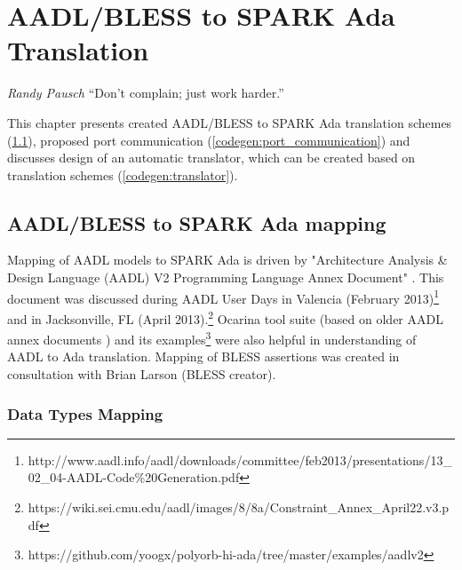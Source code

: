 
\cleardoublepage


\chapter{AADL/BLESS to SPARK Ada Translation}
\label{codegen}

\begin{chapquote}{\textit{Randy Pausch}}
``Don’t complain; just work harder.''
\end{chapquote}


This chapter presents created AADL/BLESS to SPARK Ada translation schemes (\ref{codegen:mapping}), proposed port communication (\ref{codegen:port_communication}) and discusses design of an automatic translator, which can be created based on translation schemes (\ref{codegen:translator}).



\section{AADL/BLESS to SPARK Ada mapping}
\label{codegen:mapping}


Mapping of AADL models to SPARK Ada is driven by "Architecture Analysis \& Design Language (AADL) V2 Programming Language Annex Document" \cite{AnnexDoc}. This document was discussed during AADL User Days in Valencia (February 2013)\footnote{http://www.aadl.info/aadl/downloads/committee/feb2013/presentations/13\_02\_04-AADL-Code\%20Generation.pdf} and in Jacksonville, FL (April 2013).\footnote{https://wiki.sei.cmu.edu/aadl/images/8/8a/Constraint\_Annex\_April22.v3.pdf} Ocarina tool suite (based on older AADL annex documents \cite{Ocarina:Article}) and its examples\footnote{https://github.com/yoogx/polyorb-hi-ada/tree/master/examples/aadlv2} were also helpful in understanding of AADL to Ada translation. Mapping of BLESS assertions was created in consultation with Brian Larson (BLESS creator).
 


\subsection{Data Types Mapping}
\label{codegen:mapping:data}

